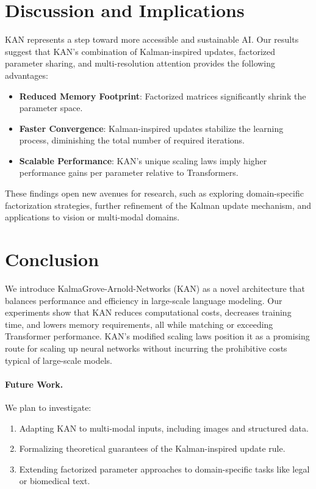 \documentclass{article}
\begin{document}
\section{Discussion and Implications}
\label{sec:discussion}

KAN represents a step toward more accessible and sustainable AI. Our results suggest that KAN’s combination of Kalman-inspired updates, factorized parameter sharing, and multi-resolution attention provides the following advantages:

\begin{itemize}
    \item \textbf{Reduced Memory Footprint}: Factorized matrices significantly shrink the parameter space.
    \item \textbf{Faster Convergence}: Kalman-inspired updates stabilize the learning process, diminishing the total number of required iterations.
    \item \textbf{Scalable Performance}: KAN’s unique scaling laws imply higher performance gains per parameter relative to Transformers.
\end{itemize}

These findings open new avenues for research, such as exploring domain-specific factorization strategies, further refinement of the Kalman update mechanism, and applications to vision or multi-modal domains.

\section{Conclusion}
\label{sec:conclusion}

We introduce KalmaGrove-Arnold-Networks (KAN) as a novel architecture that balances performance and efficiency in large-scale language modeling. Our experiments show that KAN reduces computational costs, decreases training time, and lowers memory requirements, all while matching or exceeding Transformer performance. KAN’s modified scaling laws position it as a promising route for scaling up neural networks without incurring the prohibitive costs typical of large-scale models.

\paragraph{Future Work.}
We plan to investigate:
\begin{enumerate}
    \item Adapting KAN to multi-modal inputs, including images and structured data.
    \item Formalizing theoretical guarantees of the Kalman-inspired update rule.
    \item Extending factorized parameter approaches to domain-specific tasks like legal or biomedical text.
\end{enumerate}
\end{document}
